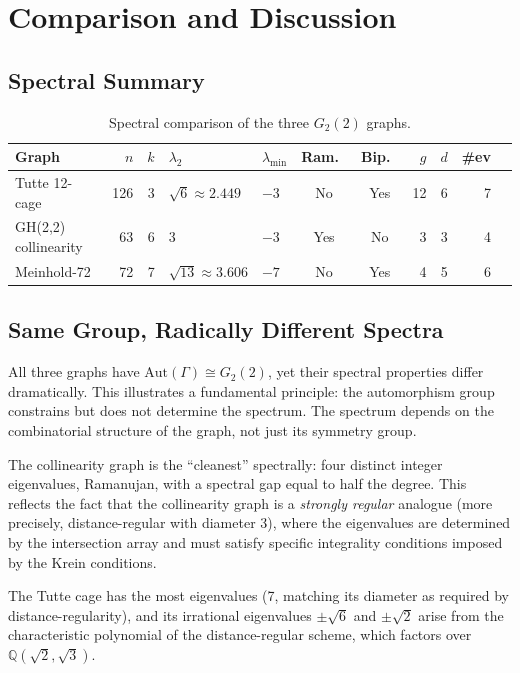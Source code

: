 \documentclass[11pt,a4paper]{article}
\theoremstyle{plain}
\theoremstyle{definition}
\theoremstyle{remark}
\newcommand{\Aut}{\mathrm{Aut}}
\begin{document}
\section{Comparison and Discussion}

\subsection{Spectral Summary}

\begin{table}[h]
\centering
\caption{Spectral comparison of the three $G_2(2)$ graphs.}
\label{tab:comparison}
\begin{tabular}{@{}lrrp{3cm}p{1.2cm}ccrrrr@{}}
\toprule
Graph & $n$ & $k$ & $\lambda_2$ & $\lambda_{\min}$ & Ram.\ & Bip.\ & $g$ & $d$ & \#ev \\
\midrule
Tutte 12-cage        & 126 & 3 & $\sqrt{6}\approx 2.449$ & $-3$ & No  & Yes & 12 & 6 & 7 \\
GH(2,2) collinearity & 63  & 6 & $3$                     & $-3$ & Yes & No  &  3 & 3 & 4 \\
Meinhold-72          & 72  & 7 & $\sqrt{13}\approx 3.606$& $-7$ & No  & Yes &  4 & 5 & 6 \\
\bottomrule
\end{tabular}
\end{table}

\subsection{Same Group, Radically Different Spectra}

All three graphs have $\Aut(\Gamma) \cong G_2(2)$, yet their spectral properties differ
dramatically.  This illustrates a fundamental principle: the automorphism group constrains
but does not determine the spectrum.  The spectrum depends on the combinatorial structure of
the graph, not just its symmetry group.

The collinearity graph is the ``cleanest'' spectrally: four distinct integer eigenvalues,
Ramanujan, with a spectral gap equal to half the degree.  This reflects the fact that the
collinearity graph is a \emph{strongly regular} analogue (more precisely, distance-regular
with diameter 3), where the eigenvalues are determined by the intersection array and must
satisfy specific integrality conditions imposed by the Krein conditions.

The Tutte cage has the most eigenvalues (7, matching its diameter as required by
distance-regularity), and its irrational eigenvalues $\pm\sqrt{6}$ and $\pm\sqrt{2}$
arise from the characteristic polynomial of the distance-regular scheme, which factors
over $\mathbb{Q}(\sqrt{2}, \sqrt{3})$.
\end{document}
